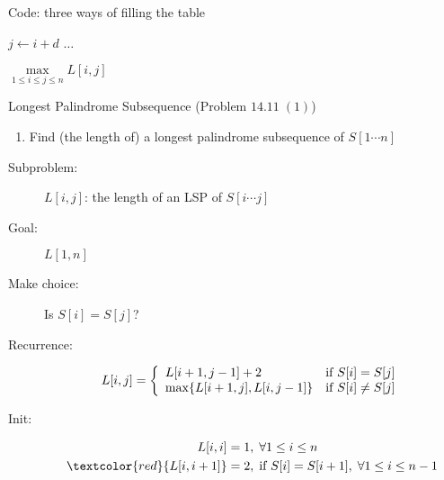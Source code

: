 \begin{frame}[fragile]{}
  Code: three ways of filling the table

  \begin{algorithmic}
	    \State $j \gets i + d$
		\State $\dots$
	  \EndFor
    \EndFor

	\State \Return $\max\limits_{1 \le i \le j \le n} L[i,j]$
  \end{algorithmic}

\end{frame}
\begin{frame}{}
  \begin{exampleblock}{Longest Palindrome Subsequence (Problem $14.11\; (1)$)}
    \begin{enumerate}[(1)]
      \item Find (the length of) a longest palindrome subsequence of $S[1 \cdots n]$
    \end{enumerate}
  \end{exampleblock}

  \begin{description}
	\item[Subproblem:] $L[i,j]$: the length of an LSP of $S[i \cdots j]$
	\item[Goal:] $L[1,n]$
	  \pause
	\item[Make choice:] Is $S[i] = S[j]$?
	\item[Recurrence:] 
	  \begin{displaymath}
		L[i,j] = \left\{ \begin{array}{ll}
		  L[i+1, j-1] + 2 & \text{if } S[i] = S[j]  \\
		  \max\{L[i+1,j], L[i,j-1]\} & \text{if } S[i] \neq S[j]
		\end{array} \right.
	  \end{displaymath}
	  \pause
	\item[Init:]
	  \begin{align*}
		L[i,i] &= 1, \; \forall 1 \le i \le n  \\
		\textcolor{red}{L[i,i+1]} &= 2, \; \text{if } S[i] = S[i+1], \; \forall 1 \le i \le n-1
	  \end{align*}
  \end{description}
\end{frame}
